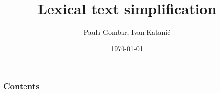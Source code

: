 \documentclass[utf8]{beamer}
\title{Lexical text simplification}
\author{Paula Gombar, Ivan Katanić}
\institute{FER}
\date{\today}
\begin{document}
\begin{frame}
\titlepage
\end{frame}

\begin{frame}
\frametitle{Contents}
\tableofcontents
\end{frame}
\end{document}
